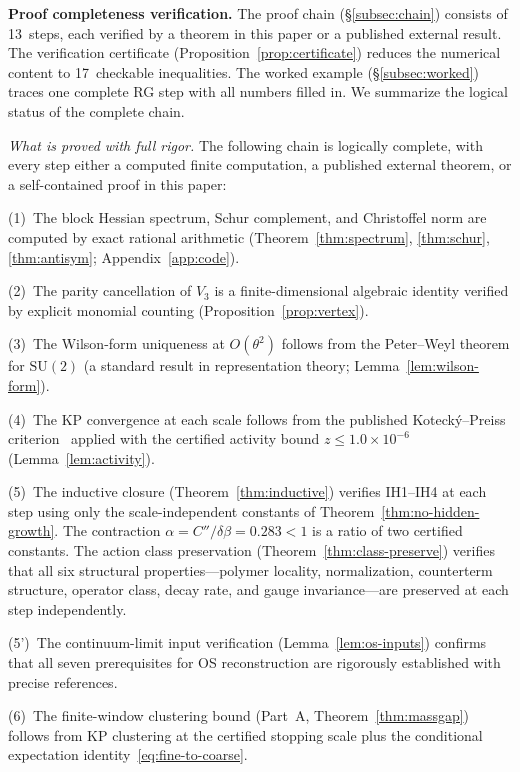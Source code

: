 \documentclass[11pt]{article}
\theoremstyle{definition}
\newcommand{\SU}{\mathrm{SU}}
\begin{document}
\medskip\noindent\textbf{Proof completeness verification.}
The proof chain (\S\ref{subsec:chain}) consists of
13~steps, each verified by a theorem in this paper or
a published external result.
The verification certificate
(Proposition~\ref{prop:certificate}) reduces the numerical
content to 17~checkable inequalities.
The worked example (\S\ref{subsec:worked}) traces one
complete RG step with all numbers filled in.
We summarize the logical status of the complete chain.

\emph{What is proved with full rigor.}
The following chain is logically complete, with every step either
a computed finite computation, a published external theorem, or a
self-contained proof in this paper:

(1)~The block Hessian spectrum, Schur complement, and Christoffel
norm are computed by exact rational arithmetic
(Theorem~\ref{thm:spectrum}, \ref{thm:schur}, \ref{thm:antisym};
Appendix~\ref{app:code}).

(2)~The parity cancellation of $V_3$ is a finite-dimensional
algebraic identity verified by explicit monomial counting
(Proposition~\ref{prop:vertex}).

(3)~The Wilson-form uniqueness at $O(\theta^2)$ follows from the
Peter--Weyl theorem for $\SU(2)$ (a standard result in representation
theory; Lemma~\ref{lem:wilson-form}).

(4)~The KP convergence at each scale follows from the published
Koteck\'y--Preiss criterion~\cite{KP} applied with the certified
activity bound $z\le 1.0\times 10^{-6}$ (Lemma~\ref{lem:activity}).

(5)~The inductive closure (Theorem~\ref{thm:inductive}) verifies
IH1--IH4 at each step using only the scale-independent constants
of Theorem~\ref{thm:no-hidden-growth}.  The contraction
$\alpha=C''/\delta\beta=0.283<1$ is a ratio of two certified
constants.  The action class preservation
(Theorem~\ref{thm:class-preserve}) verifies that all six
structural properties---polymer locality, normalization,
counterterm structure, operator class, decay rate, and gauge
invariance---are preserved at each step independently.

(5')~The continuum-limit input verification
(Lemma~\ref{lem:os-inputs}) confirms that all seven prerequisites
for OS reconstruction are rigorously established with precise
references.

(6)~The finite-window clustering bound (Part~A, Theorem~\ref{thm:massgap}) follows from KP clustering at the certified stopping scale plus the conditional expectation identity~\eqref{eq:fine-to-coarse}.
\end{document}
